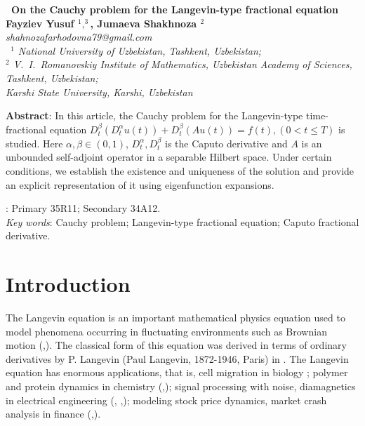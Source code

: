 \documentclass{amsart}
\numberwithin{equation}{section}
\begin{document}
\begin{center}
\textbf{{\large {\ On the Cauchy problem for the  Langevin-type fractional equation }}}\\[0pt]
\medskip \textbf{Fayziev Yusuf $^{1},^{3}$, Jumaeva Shakhnoza $^{2}$}\\[0pt]
\textit{shahnozafarhodovna79@gmail.com\\[0pt]}
\medskip \textit{\ $^{1}$ National University of Uzbekistan, Tashkent, Uzbekistan; \\ $^{2}$ V.~I.~Romanovskiy Institute of Mathematics, Uzbekistan Academy of Sciences,
Tashkent, Uzbekistan; \\ Karshi State University, Karshi, Uzbekistan }
\end{center}

\textbf{Abstract}: In this article, the Cauchy problem for the Langevin-type time-fractional equation $D_t^\beta(D_t^\alpha u(t))+D_t^\beta(Au(t))=f(t),(0<t\leq T)$  is studied. Here $\alpha,\beta \in(0,1)$, $D_t^\alpha, D_t^\beta$ is the Caputo derivative and $A$ is an unbounded self-adjoint operator in a separable Hilbert space. Under certain conditions, we establish the existence and uniqueness of the solution and provide an explicit representation of it using eigenfunction expansions.

\vskip 0.3cm  :
Primary 35R11; Secondary 34A12.\\
{\it Key words}:  Cauchy problem;  Langevin-type fractional equation; Caputo fractional derivative.

\section{Introduction}

The Langevin equation is an important mathematical physics equation used to model phenomena occurring in fluctuating environments such as Brownian motion (\cite{Lang},\cite{Coffey}). The classical form of this equation was derived in terms of ordinary derivatives by P. Langevin (Paul Langevin, 1872-1946, Paris) in \cite{Lang}. The Langevin equation has enormous applications, that is, cell migration in biology \cite{Schien}; polymer and protein dynamics in chemistry (\cite{Panja},\cite{Schluttig}); signal processing with noise, diamagnetics in electrical engineering (\cite{Coffey}, \cite{Ahmadova},\cite{Lisy}); modeling stock price dynamics, market crash analysis in finance (\cite{Bouchaud},\cite{Farahpour}).
\end{document}
